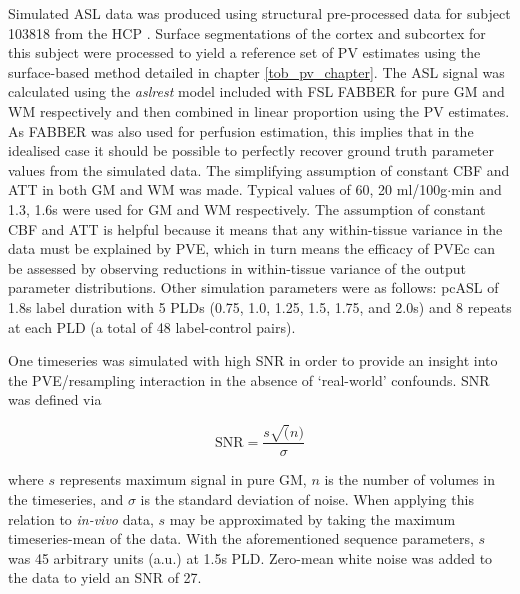 Simulated ASL data was produced using structural pre-processed data for subject 103818 from the HCP \cite{Glasser2013}. Surface segmentations of the cortex and subcortex for this subject were processed to yield a reference set of PV estimates using the surface-based method detailed in chapter \ref{tob_pv_chapter}. The ASL signal was calculated using the \textit{aslrest} model included with FSL FABBER \cite{Chappell2009} for pure GM and WM respectively and then combined in linear proportion using the PV estimates. As FABBER was also used for perfusion estimation, this implies that in the idealised case it should be possible to perfectly recover ground truth parameter values from the simulated data. The simplifying assumption of constant CBF and ATT in both GM and WM was made. Typical values of 60, 20 ml/100g$\cdot$min and 1.3, 1.6s were used for GM and WM respectively. The assumption of constant CBF and ATT is helpful because it means that any within-tissue variance in the data must be explained by PVE, which in turn means the efficacy of PVEc can be assessed by observing reductions in within-tissue variance of the output parameter distributions. Other simulation parameters were as follows: pcASL of 1.8s label duration with 5 PLDs (0.75, 1.0, 1.25, 1.5, 1.75, and 2.0s) and 8 repeats at each PLD (a total of 48 label-control pairs). 

One timeseries was simulated with high SNR in order to provide an insight into the PVE/resampling interaction in the absence of `real-world' confounds. SNR was defined via 

\begin{equation}
\label{snr_defn}
\mathrm{SNR} = \frac{s \sqrt(n)}{\sigma}
\end{equation}

where $s$ represents maximum signal in pure GM, $n$ is the number of volumes in the timeseries, and $\sigma$ is the standard deviation of noise. When applying this relation to \textit{in-vivo} data, $s$ may be approximated by taking the maximum timeseries-mean of the data. With the aforementioned sequence parameters, $s$ was 45 arbitrary units (a.u.) at 1.5s PLD. Zero-mean white noise was added to the data to yield an SNR of 27. 

